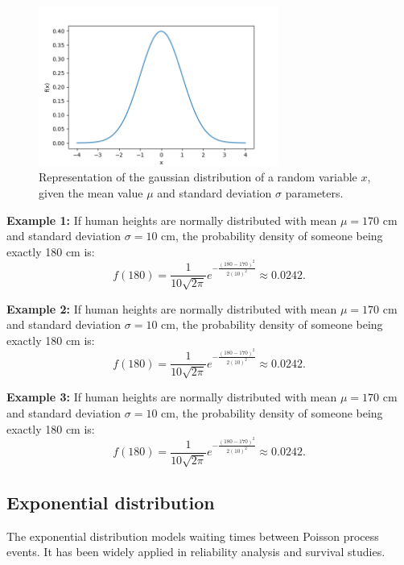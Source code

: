\documentclass{book}
\begin{document}
\begin{figure}[ht]
    \centering
    \includegraphics[width=0.7\textwidth]{figures/chapter2/normal.png}
    \caption{Representation of the gaussian distribution of a random variable $x$, given the mean value $\mu$ and standard deviation $\sigma$ parameters.}
    \label{fig:random}
\end{figure}

\textbf{Example 1:} If human heights are normally distributed with mean $\mu=170$ cm and standard deviation $\sigma=10$ cm, the probability density of someone being exactly 180 cm is:
\begin{equation}
    f(180) = \frac{1}{10 \sqrt{2\pi}} e^{-\frac{(180-170)^2}{2(10)^2}} \approx 0.0242.
\end{equation}

\textbf{Example 2:} If human heights are normally distributed with mean $\mu=170$ cm and standard deviation $\sigma=10$ cm, the probability density of someone being exactly 180 cm is:
\begin{equation}
    f(180) = \frac{1}{10 \sqrt{2\pi}} e^{-\frac{(180-170)^2}{2(10)^2}} \approx 0.0242.
\end{equation}

\textbf{Example 3:} If human heights are normally distributed with mean $\mu=170$ cm and standard deviation $\sigma=10$ cm, the probability density of someone being exactly 180 cm is:
\begin{equation}
    f(180) = \frac{1}{10 \sqrt{2\pi}} e^{-\frac{(180-170)^2}{2(10)^2}} \approx 0.0242.
\end{equation}

\newpage
\subsection{Exponential distribution}
The exponential distribution models waiting times between Poisson process events. It has been widely applied in reliability analysis and survival studies.
\end{document}
